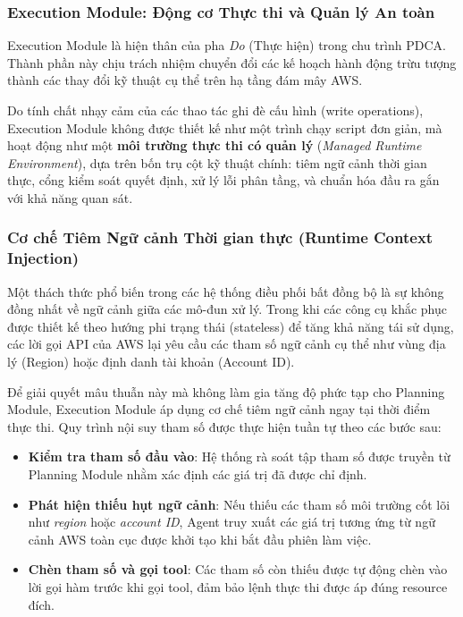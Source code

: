 \subsubsection*{Execution Module: Động cơ Thực thi và Quản lý An toàn}

Execution Module là hiện thân của pha \textit{Do} (Thực hiện)
trong chu trình PDCA.
Thành phần này chịu trách nhiệm
chuyển đổi các kế hoạch hành động trừu tượng
thành các thay đổi kỹ thuật cụ thể
trên hạ tầng đám mây AWS.

Do tính chất nhạy cảm của các thao tác
ghi đè cấu hình (write operations),
Execution Module không được thiết kế
như một trình chạy script đơn giản,
mà hoạt động như một
\textbf{môi trường thực thi có quản lý}
(\textit{Managed Runtime Environment}),
dựa trên bốn trụ cột kỹ thuật chính:
tiêm ngữ cảnh thời gian thực,
cổng kiểm soát quyết định,
xử lý lỗi phân tầng,
và chuẩn hóa đầu ra gắn với khả năng quan sát.

\subsubsection*{Cơ chế Tiêm Ngữ cảnh Thời gian thực (Runtime Context Injection)}

Một thách thức phổ biến
trong các hệ thống điều phối bất đồng bộ
là sự không đồng nhất về ngữ cảnh
giữa các mô-đun xử lý.
Trong khi các công cụ khắc phục
được thiết kế theo hướng phi trạng thái
(stateless) để tăng khả năng tái sử dụng,
các lời gọi API của AWS
lại yêu cầu các tham số ngữ cảnh cụ thể
như vùng địa lý (Region)
hoặc định danh tài khoản (Account ID).

Để giải quyết mâu thuẫn này mà không làm gia tăng độ phức tạp cho Planning Module, Execution Module áp dụng cơ chế tiêm ngữ cảnh ngay tại thời điểm thực thi. Quy trình nội suy tham số được thực hiện tuần tự theo các bước sau:
\begin{itemize}
  \item \textbf{Kiểm tra tham số đầu vào}: Hệ thống rà soát tập tham số được truyền từ Planning Module nhằm xác định các giá trị đã được chỉ định.
  \item \textbf{Phát hiện thiếu hụt ngữ cảnh}: Nếu thiếu các tham số môi trường cốt lõi như \textit{region} hoặc \textit{account ID}, Agent truy xuất các giá trị tương ứng từ ngữ cảnh AWS toàn cục được khởi tạo khi bắt đầu phiên làm việc.
  \item \textbf{Chèn tham số và gọi tool}: Các tham số còn thiếu được tự động chèn vào lời gọi hàm trước khi gọi tool, đảm bảo lệnh thực thi được áp đúng resource đích.
\end{itemize}

